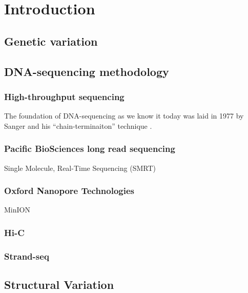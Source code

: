 \chapter{Introduction}

\section{Genetic variation}
\label{sec:variation}

\section{DNA-sequencing methodology}


\subsection{High-throughput sequencing}
\label{sec:hts}

The foundation of DNA-sequencing as we know it today was laid in 1977 by
Sanger and his ``chain-terminaiton'' technique \citep{Sanger1977}.


\subsection{Pacific BioSciences\textsuperscript{\textregistered} long read sequencing}
\label{sec:pacbio}
Single Molecule, Real-Time Sequencing (SMRT\textsuperscript{\textregistered})

\subsection{Oxford Nanopore Technologies\textsuperscript{\textregistered}}
\label{sec:ont}
MinION\textregistered

\subsection{Hi-C}
\label{sec:hic}

\subsection{Strand-seq}
\label{sec:strandseq}

\section{Structural Variation}
\label{sec:sv}
